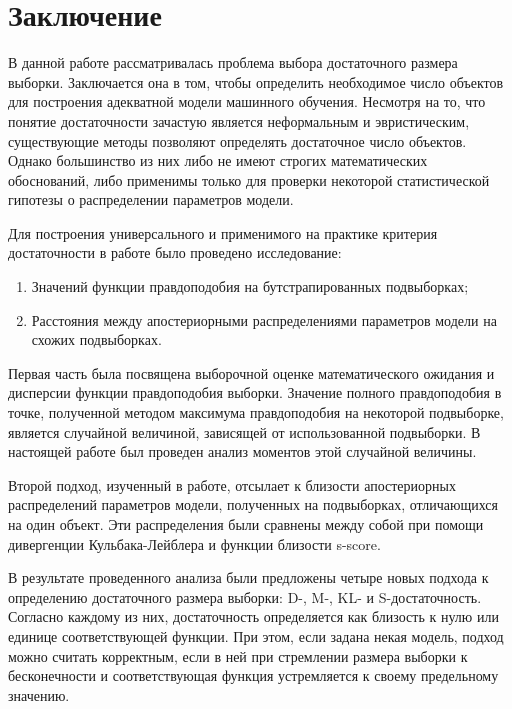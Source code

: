 \section*{Заключение}                         %

В данной работе рассматривалась проблема выбора достаточного размера выборки. Заключается она в том, чтобы определить необходимое число объектов для построения адекватной модели машинного обучения. Несмотря на то, что понятие достаточности зачастую является неформальным и эвристическим, существующие методы позволяют определять достаточное число объектов. Однако большинство из них либо не имеют строгих математических обоснований, либо применимы только для проверки некоторой статистической гипотезы о распределении параметров модели.

Для построения универсального и применимого на практике критерия достаточности в работе было проведено исследование:
\begin{enumerate}
    \item Значений функции правдоподобия на бутстрапированных подвыборках;
    \item Расстояния между апостериорными распределениями параметров модели на схожих подвыборках.
\end{enumerate}

Первая часть была посвящена выборочной оценке математического ожидания и дисперсии функции правдоподобия выборки. Значение полного правдоподобия в точке, полученной методом максимума правдоподобия на некоторой подвыборке, является случайной величиной, зависящей от использованной подвыборки. В настоящей работе был проведен анализ моментов этой случайной величины.

Второй подход, изученный в работе, отсылает к близости апостериорных распределений параметров модели, полученных на подвыборках, отличающихся на один объект. Эти распределения были сравнены между собой при помощи дивергенции Кульбака-Лейблера и функции близости s-score. 

В результате проведенного анализа были предложены четыре новых подхода к определению достаточного размера выборки: D-, M-, KL- и S-достаточность. Согласно каждому из них, достаточность определяется как близость к нулю или единице соответствующей функции. При этом, если задана некая модель, подход можно считать корректным, если в ней при стремлении размера выборки к бесконечности и соответствующая функция устремляется к своему предельному значению.

